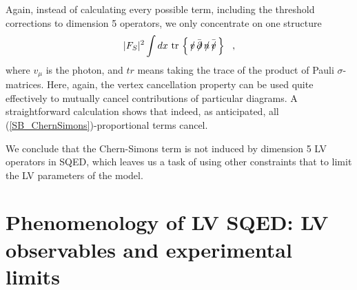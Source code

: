 \documentclass[paper,12pt]{revtex4}
\newcommand{\slashed}[1]{\hbox{{$#1$}\llap{$/$}}}
\begin{document}
	Again, instead of calculating every possible term, including the threshold corrections 
to dimension 5 operators, we only concentrate on one structure 
\begin{equation}
\label{SB_ChernSimons}
	|F_S|^2 \int dx ~ \mathrm{tr} \,\left\{\, 
	      \slashed{v} \, \bar{\slashed{\partial}} \,
	      \slashed{n} \, \bar{\slashed{v}} \,
                              \right\}
	~~,
\end{equation}
	where $ v_\mu $ is the photon, and $ tr $ means
	taking the trace of the product of Pauli 
	$ \sigma $-matrices.
	Here, again, the vertex cancellation property
	can be used quite effectively to mutually cancel 
	contributions of particular diagrams.
	A straightforward calculation shows that indeed,
	as anticipated, all (\ref{SB_ChernSimons})-proportional terms cancel.



	We conclude that  the Chern-Simons term is not induced
	by dimension 5 LV operators in SQED, which leaves us a task of 
    using other constraints that \cite{CFJ} to limit the LV parameters of the model.




\section{Phenomenology of LV SQED: LV observables and experimental limits}
\label{Reduction}
\end{document}
